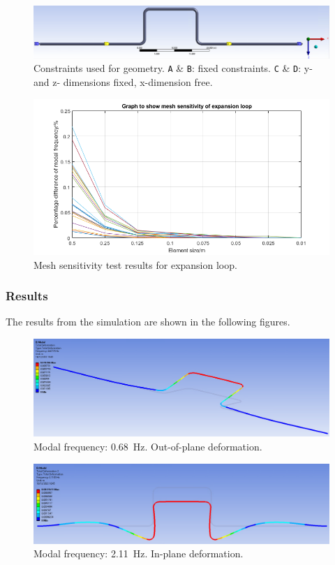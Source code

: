 \begin{figure}[H]
    \centering
    \includegraphics[width = \textwidth]{img/fig8.png}
    \caption{Constraints used for geometry. \texttt{A} \& \texttt{B}: fixed constraints. \texttt{C} \& \texttt{D}: y- and z- dimensions fixed, x-dimension free.}
    \label{constraints}
\end{figure}

\begin{figure}[H]
    \centering
    \includegraphics[width = 0.9 \textwidth]{img/fig10.png}
    \caption{Mesh sensitivity test results for expansion loop.}
    \label{mesh2}
\end{figure}
\subsubsection{Results}
The results from the simulation are shown in the following figures.
\begin{figure}[H]
    \centering
    \includegraphics[width = 0.9 \textwidth]{img/fig11.png}
    \caption{Modal frequency: \SI{0.68}{\hertz}. Out-of-plane deformation.}
    \label{sim1}
\end{figure}

\begin{figure}[H]
    \centering
    \includegraphics[width = 0.9 \textwidth]{img/fig12.png}
    \caption{Modal frequency: \SI{2.11}{\hertz}. In-plane deformation.}
    \label{sim2}
\end{figure}


